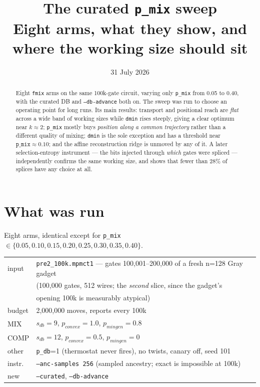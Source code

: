 \documentclass[11pt]{article}
\title{The curated \texttt{p\_mix} sweep\\
\large Eight arms, what they show, and where the working size should sit}
\date{31 July 2026}
\author{}
\begin{document}
\maketitle

\begin{abstract}
\noindent Eight \texttt{fmix} arms on the same 100k-gate circuit, varying only
\texttt{p\_mix} from 0.05 to 0.40, with the curated DB and \texttt{--db-advance}
both on. The sweep was run to choose an operating point for long runs. Its main
results: transport and positional reach are \emph{flat} across a wide band of
working sizes while \texttt{dmin} rises steeply, giving a clear optimum near
$k \approx 2$; \texttt{p\_mix} mostly buys \emph{position along a common
trajectory} rather than a different quality of mixing; \texttt{dmin} is the sole
exception and has a threshold near $\texttt{p\_mix} \approx 0.10$; and the
affine reconstruction ridge is unmoved by any of it. A later selection-entropy
instrument --- the bits injected through \emph{which} gates were spliced ---
independently confirms the same working size, and shows that fewer than 28\% of
splices have any choice at all.
\end{abstract}

\section{What was run}

Eight arms, identical except for \texttt{p\_mix} $\in \{0.05, 0.10, 0.15, 0.20,
0.25, 0.30, 0.35, 0.40\}$.

\begin{center}
\begin{tabular}{ll}
\toprule
input & \texttt{pre2\_100k.mpmct1} --- gates 100{,}001--200{,}000 of a fresh
        n=128 Gray gadget \\
      & (100{,}000 gates, 512 wires; the \emph{second} slice, since the gadget's \\
      & opening 100k is measurably atypical) \\
budget & 2{,}000{,}000 moves, reports every 100k \\
MIX & $s_{db}=9$, $p_{convex}=1.0$, $p_{mingen}=0.8$ \\
COMP & $s_{db}=12$, $p_{convex}=0.5$, $p_{mingen}=0$ \\
other & \texttt{p\_db}=1 (thermostat never fires), no twists, canary off, seed 101 \\
instr. & \texttt{--anc-samples 256} (sampled ancestry; exact is impossible at 100k) \\
new & \texttt{--curated}, \texttt{--db-advance} \\
\bottomrule
\end{tabular}
\end{center}
\end{document}

